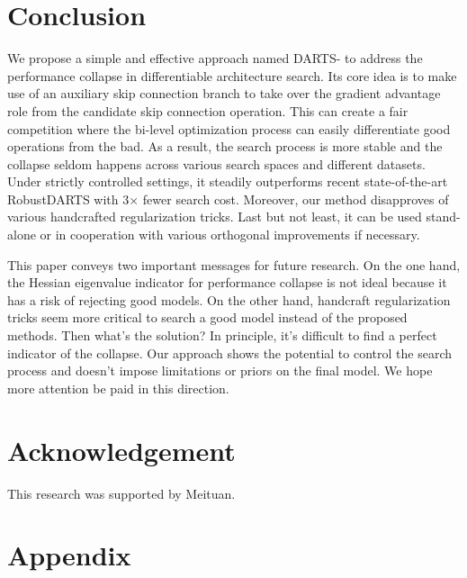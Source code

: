 \documentclass{article} \usepackage{iclr2021_conference,times}
\begin{document}
\section{Conclusion}
We propose a simple and effective approach named DARTS- to address the performance collapse in differentiable architecture search. Its core idea is to make use of an auxiliary skip connection branch to take over the gradient advantage role from the candidate skip connection operation. This can create a fair competition where the bi-level optimization process can  easily differentiate good operations from the bad. As a result, the search process is more stable and the collapse seldom happens across various search spaces and different datasets. 
Under strictly controlled settings, it steadily outperforms recent state-of-the-art RobustDARTS \citep{zela2020understanding}  with 3$\times$ fewer search cost.
Moreover, our method disapproves of various handcrafted regularization tricks. Last but not least, it can be used stand-alone or in cooperation with various orthogonal improvements if necessary.

This paper conveys two important messages for future research. On the one hand, the Hessian eigenvalue indicator for performance collapse \citep{zela2020understanding,chen2020stabilizing} is not ideal because it has a risk of rejecting good models. On the other hand, handcraft regularization tricks \citep{chen2019progressive} seem more critical to search a good model instead of the proposed methods.  Then what's the solution? In principle, it's difficult to find a perfect indicator of the collapse. Our approach shows the potential to control the search process and doesn't impose limitations or priors on the final model.  We hope more attention be paid in this direction.

\section{Acknowledgement}
This research was supported by Meituan.



\clearpage
\appendix
\section{Appendix}
\end{document}
